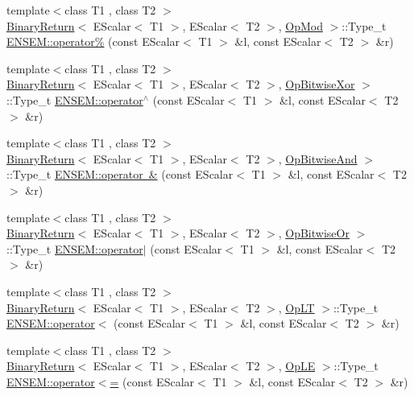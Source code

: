 \begin{DoxyCompactItemize}
\item 
{\footnotesize template$<$class T1 , class T2 $>$ }\\\mbox{\hyperlink{structBinaryReturn}{Binary\+Return}}$<$ E\+Scalar$<$ T1 $>$, E\+Scalar$<$ T2 $>$, \mbox{\hyperlink{structOpMod}{Op\+Mod}} $>$\+::Type\+\_\+t \mbox{\hyperlink{group__escalar_ga970051624cd8616f50a03dcaa2fdc4db}{E\+N\+S\+E\+M\+::operator\%}} (const E\+Scalar$<$ T1 $>$ \&l, const E\+Scalar$<$ T2 $>$ \&r)
\item 
{\footnotesize template$<$class T1 , class T2 $>$ }\\\mbox{\hyperlink{structBinaryReturn}{Binary\+Return}}$<$ E\+Scalar$<$ T1 $>$, E\+Scalar$<$ T2 $>$, \mbox{\hyperlink{structOpBitwiseXor}{Op\+Bitwise\+Xor}} $>$\+::Type\+\_\+t \mbox{\hyperlink{group__escalar_ga61ae38c220aff90c4be30fbab0974540}{E\+N\+S\+E\+M\+::operator$^\wedge$}} (const E\+Scalar$<$ T1 $>$ \&l, const E\+Scalar$<$ T2 $>$ \&r)
\item 
{\footnotesize template$<$class T1 , class T2 $>$ }\\\mbox{\hyperlink{structBinaryReturn}{Binary\+Return}}$<$ E\+Scalar$<$ T1 $>$, E\+Scalar$<$ T2 $>$, \mbox{\hyperlink{structOpBitwiseAnd}{Op\+Bitwise\+And}} $>$\+::Type\+\_\+t \mbox{\hyperlink{group__escalar_ga445352dd6ecea4dcb57bfd1abcda2a0b}{E\+N\+S\+E\+M\+::operator \&}} (const E\+Scalar$<$ T1 $>$ \&l, const E\+Scalar$<$ T2 $>$ \&r)
\item 
{\footnotesize template$<$class T1 , class T2 $>$ }\\\mbox{\hyperlink{structBinaryReturn}{Binary\+Return}}$<$ E\+Scalar$<$ T1 $>$, E\+Scalar$<$ T2 $>$, \mbox{\hyperlink{structOpBitwiseOr}{Op\+Bitwise\+Or}} $>$\+::Type\+\_\+t \mbox{\hyperlink{group__escalar_gadc4bc2eaed30b8d8661741f6ece0de03}{E\+N\+S\+E\+M\+::operator$\vert$}} (const E\+Scalar$<$ T1 $>$ \&l, const E\+Scalar$<$ T2 $>$ \&r)
\item 
{\footnotesize template$<$class T1 , class T2 $>$ }\\\mbox{\hyperlink{structBinaryReturn}{Binary\+Return}}$<$ E\+Scalar$<$ T1 $>$, E\+Scalar$<$ T2 $>$, \mbox{\hyperlink{structOpLT}{Op\+LT}} $>$\+::Type\+\_\+t \mbox{\hyperlink{group__escalar_gad3a307ef5e78a5c23670ded8c75cdde5}{E\+N\+S\+E\+M\+::operator$<$}} (const E\+Scalar$<$ T1 $>$ \&l, const E\+Scalar$<$ T2 $>$ \&r)
\item 
{\footnotesize template$<$class T1 , class T2 $>$ }\\\mbox{\hyperlink{structBinaryReturn}{Binary\+Return}}$<$ E\+Scalar$<$ T1 $>$, E\+Scalar$<$ T2 $>$, \mbox{\hyperlink{structOpLE}{Op\+LE}} $>$\+::Type\+\_\+t \mbox{\hyperlink{group__escalar_gaf6abf7f5f838e38b67549d4af6f8683a}{E\+N\+S\+E\+M\+::operator$<$=}} (const E\+Scalar$<$ T1 $>$ \&l, const E\+Scalar$<$ T2 $>$ \&r)

\end{DoxyCompactItemize}

